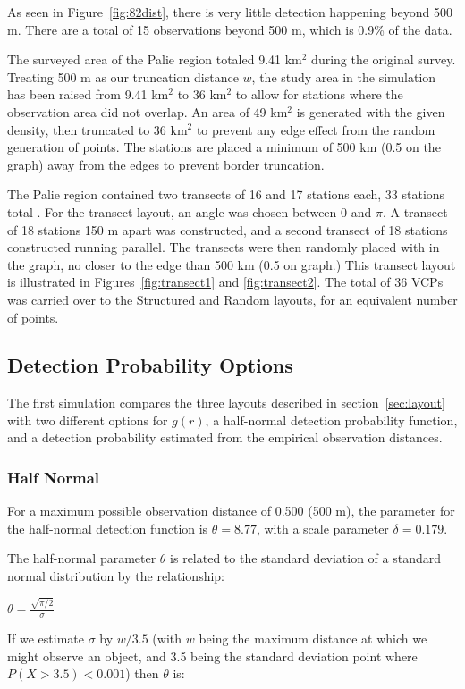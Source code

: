 \documentclass[12pt]{article}
\begin{document}
As seen in Figure~\ref{fig:82dist}, there is very little detection happening beyond 500 m. There are a total of 15 observations beyond 500 m, which is 0.9\% of the data. 

The surveyed area of the Palie region totaled 9.41 km$^2$ during the original survey. Treating 500 m as our truncation distance $w$, the study area in the simulation has been raised from 9.41 km$^2$ to 36 km$^2$ to allow for stations where the observation area did not overlap. An area of 49 km$^2$ is generated with the given density, then truncated to 36 km$^2$ to prevent any edge effect from the random generation of points. The stations are placed a minimum of 500 km (0.5 on the graph) away from the edges to prevent border truncation. 

The Palie region contained two transects of 16 and 17 stations each, 33 stations total \parencite{micronesian}. For the transect layout, an angle was chosen between $0$ and $\pi$. A transect of 18 stations 150 m apart was constructed, and a second transect of 18 stations constructed running parallel. The transects were then randomly placed with in the graph, no closer to the edge than 500 km (0.5 on graph.) This transect layout is illustrated in Figures~\ref{fig:transect1} and \ref{fig:transect2}. The total of 36 VCPs was carried over to the Structured and Random layouts, for an equivalent number of points.

\subsection{Detection Probability Options}
The first simulation compares the three layouts described in section~\ref{sec:layout} with two different options for $g(r)$, a half-normal detection probability function, and a detection probability estimated from the empirical observation distances.
\subsubsection{Half Normal}
For a maximum possible observation distance of 0.500 (500 m), the parameter for the half-normal detection function is $\theta = 8.77$, with a scale parameter $\delta = 0.179$.

The half-normal parameter $\theta$ is related to the standard deviation of a standard normal distribution by the relationship:

$\theta = \frac{\sqrt{\pi /2}}{\sigma}$

If we estimate $\sigma$ by $w/3.5$ (with $w$ being the maximum distance at which we might observe an object, and 3.5 being the standard deviation point where $P(X > 3.5) < 0.001$) then $\theta$ is:
\end{document}
